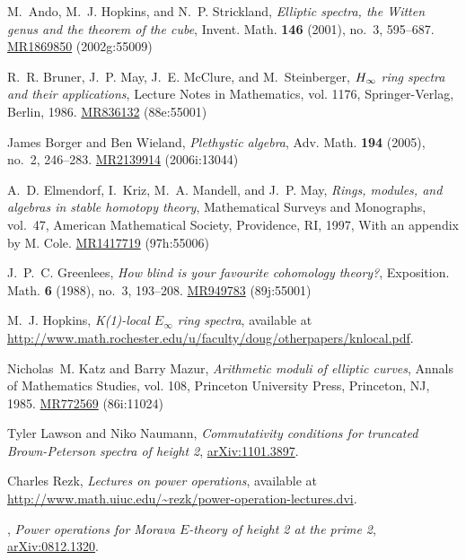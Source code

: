 \documentclass{gtpart}
\theoremstyle{definition}
\theoremstyle{remark}
\begin{document}
\newcommand{\MRn}[2]{\href{http://www.ams.org/mathscinet-getitem?mr=#1}{MR#1} #2}
\begin{thebibliography}

M.~Ando, M.~J. Hopkins, and N.~P. Strickland, \emph{Elliptic spectra, the
  {W}itten genus and the theorem of the cube}, Invent. Math. \textbf{146}
  (2001), no.~3, 595--687. \MRn{1869850}{(2002g:55009)}

R.~R. Bruner, J.~P. May, J.~E. McClure, and M.~Steinberger, \emph{{$H\sb \infty
  $} ring spectra and their applications}, Lecture Notes in Mathematics, vol.
  1176, Springer-Verlag, Berlin, 1986. \MRn{836132}{(88e:55001)}

James Borger and Ben Wieland, \emph{Plethystic algebra}, Adv. Math.
  \textbf{194} (2005), no.~2, 246--283. \MRn{2139914}{(2006i:13044)}

A.~D. Elmendorf, I.~Kriz, M.~A. Mandell, and J.~P. May, \emph{Rings, modules,
  and algebras in stable homotopy theory}, Mathematical Surveys and Monographs,
  vol.~47, American Mathematical Society, Providence, RI, 1997, With an
  appendix by M. Cole. \MRn{1417719}{(97h:55006)}

J.~P.~C. Greenlees, \emph{How blind is your favourite cohomology theory?},
  Exposition. Math. \textbf{6} (1988), no.~3, 193--208. \MRn{949783}{(89j:55001)}

M.~J. Hopkins, \emph{K(1)-local ${E}_\infty$ ring spectra}, available at
  \url{http://www.math.rochester.edu/u/faculty/doug/otherpapers/knlocal.pdf}.

Nicholas~M. Katz and Barry Mazur, \emph{Arithmetic moduli of elliptic curves},
  Annals of Mathematics Studies, vol. 108, Princeton University Press,
  Princeton, NJ, 1985. \MRn{772569}{(86i:11024)}

Tyler Lawson and Niko Naumann, \emph{Commutativity conditions for truncated
  {B}rown-{P}eterson spectra of height 2}, \href{http://arxiv.org/abs/1101.3897}{arXiv:1101.3897}.

Charles Rezk, \emph{Lectures on power operations}, available at
  \url{http://www.math.uiuc.edu/~rezk/power-operation-lectures.dvi}.

\bysame, \emph{Power operations for {M}orava ${E}$-theory of height 2 at the
  prime 2}, \href{http://arxiv.org/abs/0812.1320}{arXiv:0812.1320}.


\end{thebibliography}
\end{document}

